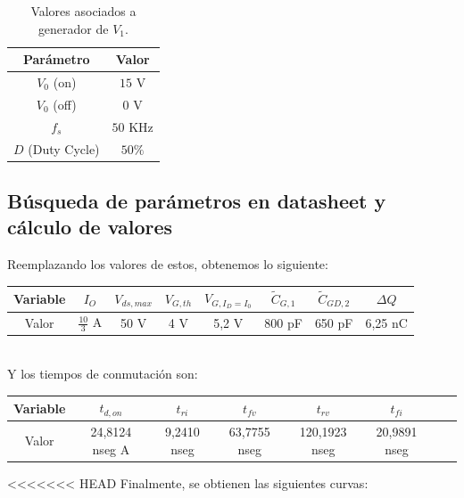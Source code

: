 \documentclass[e4_tp1_main.tex]{subfiles}
\begin{document}
\begin{table}[H]
\centering
\begin{tabular}{|c|c|}
\hline
Parámetro & Valor \\
\hline
$V_0$ (on) & $15$ V \\
\hline
$V_0$ (off) & $0$ V \\
\hline
$f_s$ & $50$ KHz \\
\hline
$D$ (Duty Cycle) & $50\%$ \\
\hline
\end{tabular}
\caption{Valores asociados a generador de $V_1$.}
\end{table}

\subsection{Búsqueda de parámetros en datasheet y cálculo de valores}

Reemplazando los valores de estos, obtenemos lo siguiente:\\
\centering
\begin{tabular}{|c|c|c|c|c|c|c|c|}
\hline
Variable & $I_O$ & $V_{ds,max}$ & $V_{G,th}$ & $V_{G,I_D=I_0}$ & $\tilde{C}_{G,1}$ & $\tilde{C}_{GD,2}$ & $\Delta Q$  \\
\hline
Valor & $\frac{10}{3}$ A & 50 V & 4 V & 5,2 V & 800 pF & 650 pF & 6,25 nC\\
\hline
\end{tabular}\\
Y los tiempos de conmutación son:\\
\centering
\begin{tabular}{|c|c|c|c|c|c|c|c|}
\hline
Variable & $t_{d,on}$ & $t_{ri}$ & $t_{fv}$ & $t_{rv}$ & $t_{fi}$  \\
\hline
Valor & 24,8124 nseg A & 9,2410 nseg & 63,7755 nseg & 120,1923 nseg & 20,9891 nseg\\
\hline
\end{tabular}

<<<<<<< HEAD
Finalmente, se obtienen las siguientes curvas:
\end{document}
